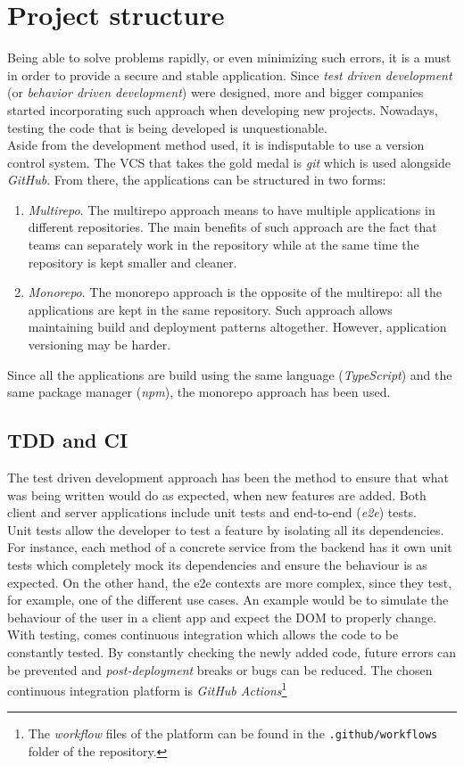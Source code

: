 \documentclass[a4paper, 12pt, oneside]{book}
\begin{document}
\section{Project structure}
Being able to solve problems rapidly, or even minimizing such errors, it is a must in order to provide a secure and stable application. Since \emph{test driven development} (or \emph{behavior driven development}) were designed, more and bigger companies started incorporating such approach when developing new projects. Nowadays, testing the code that is being developed is unquestionable.
\\[8pt]
Aside from the development method used, it is indisputable to use a version control system. The VCS that takes the gold medal is \emph{git} which is used alongside \emph{GitHub}. From there, the applications can be structured in two forms:
\begin{enumerate}[label = -]
	\item \emph{Multirepo}. The multirepo approach means to have multiple applications in different repositories. The main benefits of such approach are the fact that teams can separately work in the repository while at the same time the repository is kept smaller and cleaner.
	\item \emph{Monorepo}. The monorepo approach is the opposite of the multirepo: all the applications are kept in the same repository. Such approach allows maintaining build and deployment patterns altogether. However, application versioning may be harder.
\end{enumerate}
Since all the applications are build using the same language (\emph{TypeScript}) and the same package manager (\emph{npm}), the monorepo approach has been used.
\subsection{TDD and CI}
The test driven development approach has been the method to ensure that what was being written would do as expected, when new features are added. Both client and server applications include unit tests and end-to-end (\emph{e2e}) tests.
\\[8pt]
Unit tests allow the developer to test a feature by isolating all its dependencies. For instance, each method of a concrete service from the backend has it own unit tests which completely mock its dependencies and ensure the behaviour is as expected. On the other hand, the e2e contexts are more complex, since they test, for example, one of the different use cases. An example would be to simulate the behaviour of the user in a client app and expect the DOM to properly change.
\\[8pt]
With testing, comes continuous integration which allows the code to be constantly tested. By constantly checking the newly added code, future errors can be prevented and \emph{post-deployment} breaks or bugs can be reduced. The chosen continuous integration platform is \emph{GitHub Actions}\footnote{The \emph{workflow} files of the platform can be found in the \texttt{.github/workflows} folder of the repository.}
\end{document}
